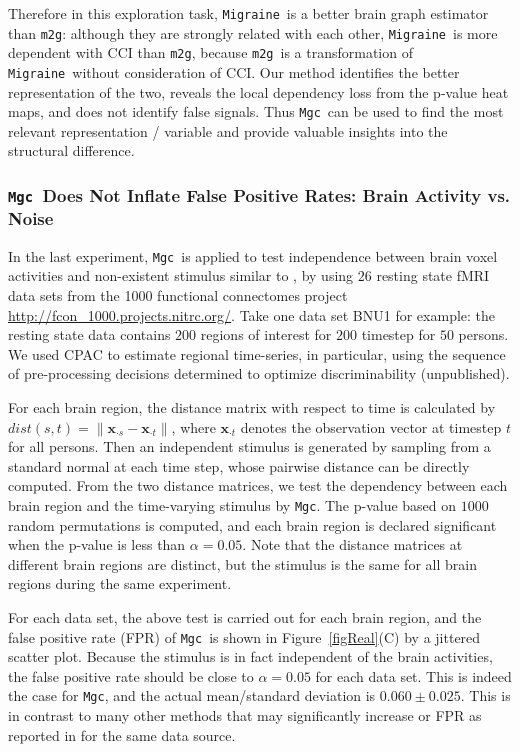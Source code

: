 \documentclass[11pt]{article}
\newcommand{\note}[2][]{\added[#1,remark={#2}]{}}
\providecommand{\sct}[1]{{\sc \texttt{#1}}}
\providecommand{\mb}[1]{\boldsymbol{#1}}
\newcommand{\Migraine}{\sct{Migraine}}
\newcommand{\mtg}{\sct{m2g}}
\newcommand{\Mgc}{\sct{Mgc}}
\newcommand{\jovo}[1]{{\note{jv: #1}}}
\newcommand{\cs}[1]{{\note{cs: #1}}}
\newcommand{\mbx}{\ensuremath{\mb{x}}}
\begin{document}
Therefore in this exploration task, \Migraine~is a better brain graph estimator than \mtg: although they are strongly related with each other, \Migraine~is more dependent with CCI than \mtg, because \mtg~is a transformation of \Migraine~without consideration of CCI. Our method identifies the better representation of the two, reveals the local dependency loss from the p-value heat maps, and does not identify false signals. Thus \Mgc~can be used to find the most relevant representation / variable and provide valuable insights into the structural difference.

\subsubsection[Correct False Positive Rate]{\Mgc~Does Not Inflate False Positive Rates: Brain Activity vs. Noise}

In the last experiment, \Mgc~is applied to test independence between brain voxel activities and non-existent stimulus similar to \cite{EklundKnutsson2012}, by using $26$ resting state fMRI data sets from the 1000 functional connectomes project \url{http://fcon_1000.projects.nitrc.org/}. Take one data set BNU1 for example: the resting state data contains $200$ regions of interest for $200$ timestep for $50$ persons. We used CPAC\cs{cite CPAC} to estimate regional time-series, in particular, using the sequence of pre-processing decisions determined to optimize discriminability (unpublished).

For each brain region, the distance matrix with respect to time is calculated by $dist(s,t)=\|\mbx_{\cdot s}-\mbx_{\cdot t}\|$, where $\mbx_{\cdot t}$ denotes the observation vector at timestep $t$ for all persons. Then an independent stimulus is generated by sampling from a standard normal at each time step, whose pairwise distance can be directly computed. From the two distance matrices, we test the dependency between each brain region and the time-varying stimulus by \Mgc. The p-value based on $1000$ random permutations is computed, and each brain region is declared significant when the p-value is less than $\alpha=0.05$. Note that the distance matrices at different brain regions are distinct, but the stimulus is the same for all brain regions during the same experiment.

For each data set, the above test is carried out for each brain region, and the false positive rate (FPR) of \Mgc~is shown in Figure~\ref{figReal}(C) by a jittered scatter plot. %
\jovo{fix after fixing fig}\cs{fixed} Because the stimulus is in fact independent of the brain activities, the false positive rate should be close to $\alpha=0.05$ for each data set. This is indeed the case for \Mgc, and the actual mean/standard deviation is $0.060 \pm 0.025$. This is in contrast to many other methods that may significantly increase or FPR as reported in \cite{EklundKnutsson2012} for the same data source.
\end{document}
